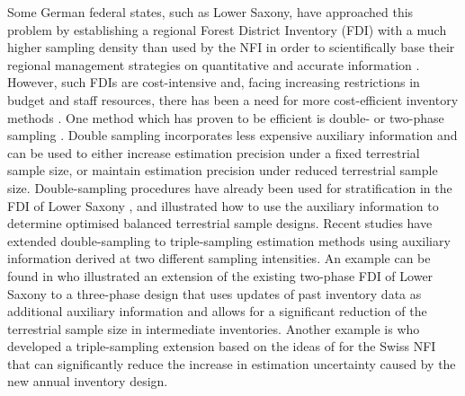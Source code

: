 Some German federal states, such as Lower Saxony, have approached this problem by establishing a regional Forest District Inventory (FDI) with a much higher sampling density than used by the NFI in order to scientifically base their regional management strategies on quantitative and accurate information \citep{bockmann1998}. However, such FDIs are cost-intensive and, facing increasing restrictions in budget and staff resources, there has been a need for more cost-efficient inventory methods \citep{vonluepke2013}. One method which has proven to be efficient is double- or two-phase sampling \citep{sarndal2003, gregoire2007, kohl2006, mandallaz2008}. Double sampling incorporates less expensive auxiliary information and can be used to either increase estimation precision under a fixed terrestrial sample size, or maintain estimation precision under reduced terrestrial sample size. Double-sampling procedures have already been used for stratification in the FDI of Lower Saxony \citep{saborowski2010}, and \citet{grafstrom2017a} illustrated how to use the auxiliary information to determine optimised balanced terrestrial sample designs. Recent studies have extended double-sampling to triple-sampling estimation methods using auxiliary information derived at two different sampling intensities. An example can be found in \citet{vonLuepke2012} who illustrated an extension of the existing two-phase FDI of Lower Saxony to a three-phase design that uses updates of past inventory data as additional auxiliary information and allows for a significant reduction of the terrestrial sample size in intermediate inventories. Another example is \citet{massey2014a} who developed a triple-sampling extension based on the ideas of \citet{mandallaz2013c} for the Swiss NFI that can significantly reduce the increase in estimation uncertainty caused by the new annual inventory design.\par

